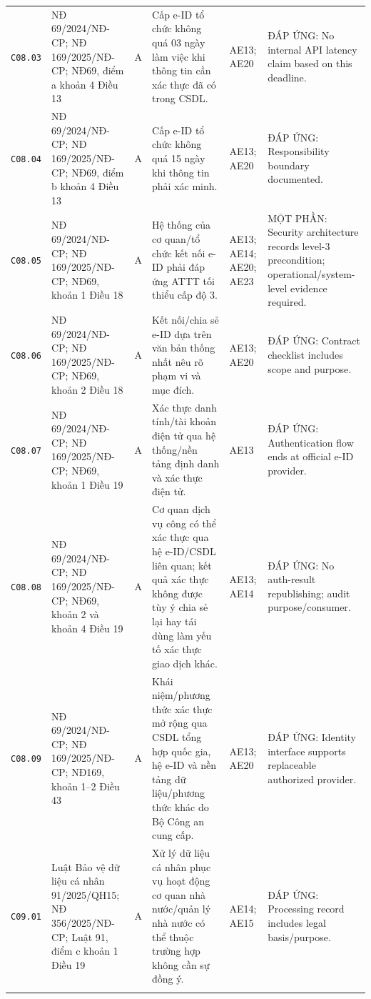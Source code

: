 \begin{longtable}{@{}p{0.9cm}p{3.0cm}p{0.55cm}p{4.05cm}p{2.0cm}p{3.45cm}@{}}
\texttt{C08.03} & NĐ 69/2024/NĐ-CP; NĐ 169/2025/NĐ-CP; NĐ69, điểm a khoản 4 Điều 13 & A & Cấp e-ID tổ chức không quá 03 ngày làm việc khi thông tin cần xác thực đã có trong CSDL. & AE13; AE20 & ĐÁP ỨNG: No internal API latency claim based on this deadline. \\ \addlinespace[1pt]
\texttt{C08.04} & NĐ 69/2024/NĐ-CP; NĐ 169/2025/NĐ-CP; NĐ69, điểm b khoản 4 Điều 13 & A & Cấp e-ID tổ chức không quá 15 ngày khi thông tin phải xác minh. & AE13; AE20 & ĐÁP ỨNG: Responsibility boundary documented. \\ \addlinespace[1pt]
\texttt{C08.05} & NĐ 69/2024/NĐ-CP; NĐ 169/2025/NĐ-CP; NĐ69, khoản 1 Điều 18 & A & Hệ thống của cơ quan/tổ chức kết nối e-ID phải đáp ứng ATTT tối thiểu cấp độ 3. & AE13; AE14; AE20; AE23 & MỘT PHẦN: Security architecture records level-3 precondition; operational/system-level evidence required. \\ \addlinespace[1pt]
\texttt{C08.06} & NĐ 69/2024/NĐ-CP; NĐ 169/2025/NĐ-CP; NĐ69, khoản 2 Điều 18 & A & Kết nối/chia sẻ e-ID dựa trên văn bản thống nhất nêu rõ phạm vi và mục đích. & AE13; AE20 & ĐÁP ỨNG: Contract checklist includes scope and purpose. \\ \addlinespace[1pt]
\texttt{C08.07} & NĐ 69/2024/NĐ-CP; NĐ 169/2025/NĐ-CP; NĐ69, khoản 1 Điều 19 & A & Xác thực danh tính/tài khoản điện tử qua hệ thống/nền tảng định danh và xác thực điện tử. & AE13 & ĐÁP ỨNG: Authentication flow ends at official e-ID provider. \\ \addlinespace[1pt]
\texttt{C08.08} & NĐ 69/2024/NĐ-CP; NĐ 169/2025/NĐ-CP; NĐ69, khoản 2 và khoản 4 Điều 19 & A & Cơ quan dịch vụ công có thể xác thực qua hệ e-ID/CSDL liên quan; kết quả xác thực không được tùy ý chia sẻ lại hay tái dùng làm yếu tố xác thực giao dịch khác. & AE13; AE14 & ĐÁP ỨNG: No auth-result republishing; audit purpose/consumer. \\ \addlinespace[1pt]
\texttt{C08.09} & NĐ 69/2024/NĐ-CP; NĐ 169/2025/NĐ-CP; NĐ169, khoản 1--2 Điều 43 & A & Khái niệm/phương thức xác thực mở rộng qua CSDL tổng hợp quốc gia, hệ e-ID và nền tảng dữ liệu/phương thức khác do Bộ Công an cung cấp. & AE13; AE20 & ĐÁP ỨNG: Identity interface supports replaceable authorized provider. \\ \addlinespace[1pt]
\texttt{C09.01} & Luật Bảo vệ dữ liệu cá nhân 91/2025/QH15; NĐ 356/2025/NĐ-CP; Luật 91, điểm c khoản 1 Điều 19 & A & Xử lý dữ liệu cá nhân phục vụ hoạt động cơ quan nhà nước/quản lý nhà nước có thể thuộc trường hợp không cần sự đồng ý. & AE14; AE15 & ĐÁP ỨNG: Processing record includes legal basis/purpose. \\ \addlinespace[1pt]

\end{longtable}
